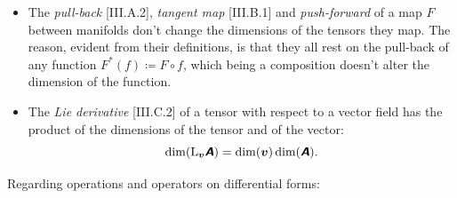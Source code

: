 \documentclass[\ifafour a4paper,12pt,\else a5paper,10pt,\fi%
onecolumn,oneside,article,%
british%
]{memoir}
\theoremstyle{remark}
\theoremstyle{innote}
\newcommand*{\mathte}[1]{\textbf{\textit{\textsf{#1}}}}
\newcommand*{\defd}{\coloneqq}
\renewcommand*{\|}[1][]{\nonscript\,#1\vert\nonscript\;\mathopen{}}
\newcommand*{\Li}{\mathrm{L}}
\newcommand*{\yA}{\mathte{A}}
\newcommand*{\yB}{\mathte{B}}
\newcommand*{\yv}{\bm{v}}
\begin{document}
\begin{itemize}[wide=0pt]
\smallskip

\item The \emph{pull-back} [III.A.2], \emph{tangent map} [III.B.1] and
  \emph{push-forward} of a map $F$ between manifolds don't change the
  dimensions of the tensors they map. The reason, evident from their
  definitions, is that they all rest on the pull-back of any function
  $F^{*}(f) \defd F\circ f$, which being a composition doesn't alter the
  dimension of the function.

\smallskip

\item The \emph{Lie derivative} [III.C.2] of a tensor with respect to a
  vector field has the product of the dimensions of the tensor and of the
  vector:
  \begin{equation}
    \dim(\Li_{\yv}\yA) =\dim(\yv)\dim(\yA).
    \label{eq:lie_der}
\end{equation}
\end{itemize}

\medskip

Regarding operations and operators on differential forms:
\end{document}

